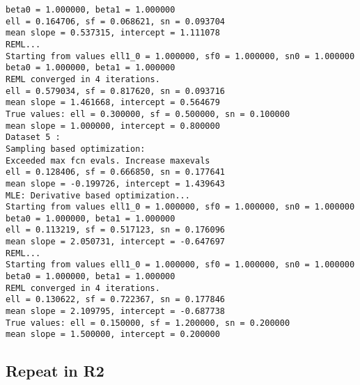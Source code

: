 \begin{verbatim}
beta0 = 1.000000, beta1 = 1.000000 
ell = 0.164706, sf = 0.068621, sn = 0.093704 
mean slope = 0.537315, intercept = 1.111078 
REML...
Starting from values ell1_0 = 1.000000, sf0 = 1.000000, sn0 = 1.000000 
beta0 = 1.000000, beta1 = 1.000000 
REML converged in 4 iterations. 
ell = 0.579034, sf = 0.817620, sn = 0.093716 
mean slope = 1.461668, intercept = 0.564679 
True values: ell = 0.300000, sf = 0.500000, sn = 0.100000 
mean slope = 1.000000, intercept = 0.800000 
Dataset 5 : 
Sampling based optimization:
Exceeded max fcn evals. Increase maxevals
ell = 0.128406, sf = 0.666850, sn = 0.177641 
mean slope = -0.199726, intercept = 1.439643 
MLE: Derivative based optimization...
Starting from values ell1_0 = 1.000000, sf0 = 1.000000, sn0 = 1.000000 
beta0 = 1.000000, beta1 = 1.000000 
ell = 0.113219, sf = 0.517123, sn = 0.176096 
mean slope = 2.050731, intercept = -0.647697 
REML...
Starting from values ell1_0 = 1.000000, sf0 = 1.000000, sn0 = 1.000000 
beta0 = 1.000000, beta1 = 1.000000 
REML converged in 4 iterations. 
ell = 0.130622, sf = 0.722367, sn = 0.177846 
mean slope = 2.109795, intercept = -0.687738 
True values: ell = 0.150000, sf = 1.200000, sn = 0.200000 
mean slope = 1.500000, intercept = 0.200000 
\end{verbatim} \color{black}
    

\subsection*{Repeat in R2}

